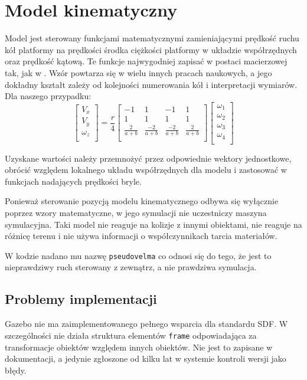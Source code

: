 \section{Model kinematyczny}
Model jest sterowany funkcjami matematycznymi zamieniającymi prędkość ruchu kół platformy na prędkości środka ciężkości platformy w układzie współrzędnych oraz prędkość kątową.
Te funkcje najwygodniej zapisać w postaci macierzowej tak, jak w \cite{wheels}. Wzór powtarza się w wielu innych pracach naukowych, a jego dokładny kształt zależy od kolejności numerowania kół i interpretacji wymiarów.
Dla naszego przypadku:
\[
 \begin{bmatrix}
  V_x \\
  V_y \\
  \omega_z \\
 \end{bmatrix}
 =
 \frac{r}{4}
 \begin{bmatrix}
  -1 & 1 & -1 & 1 \\
  1 & 1 & 1 & 1 \\
  \frac{2}{a+b} & \frac{-2}{a+b} & \frac{-2}{a+b} & \frac{2}{a+b} \\
 \end{bmatrix}
\begin{bmatrix}
 \omega_1 \\
 \omega_2 \\
 \omega_3 \\
 \omega_4 \\
\end{bmatrix}
\]

Uzyskane wartości należy przemnożyć przez odpowiednie wektory jednostkowe, obrócić względem lokalnego układu współrzędnych dla modelu i zastosować w funkcjach nadających prędkości bryle.

Ponieważ sterowanie pozycją modelu kinematycznego odbywa się wyłącznie poprzez wzory matematyczne, w jego symulacji nie uczestniczy maszyna symulacyjna.
Taki model nie reaguje na kolizje z innymi obiektami, nie reaguje na różnicę terenu i nie używa informacji o współczynnikach tarcia materiałów.

W kodzie nadano mu nazwę \texttt{pseudovelma} co odnosi się do tego, że jest to nieprawdziwy ruch sterowany z zewnątrz, a nie prawdziwa symulacja.

\subsection{Problemy implementacji}
Gazebo nie ma zaimplementowanego pełnego wsparcia dla standardu SDF.
W szczególności nie działa struktura elementów \texttt{frame} odpowiadająca za transformacje obiektów względem innych obiektów.
Nie jest to zapisane w dokumentacji, a jedynie zgłoszone od kilku lat w systemie kontroli wersji jako błędy.

